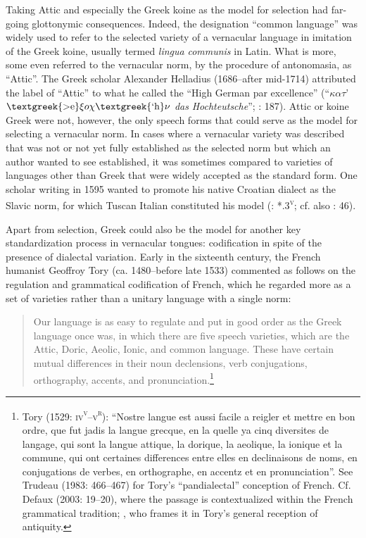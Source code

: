 Taking Attic and especially the Greek koine as the model for selection had far-going glottonymic consequences. Indeed, the designation “common language” was widely used to refer to the selected variety of a vernacular language in imitation of the Greek koine, usually termed \textit{lingua} \textit{communis} in Latin. What is more, some even referred to the vernacular norm, by the procedure of antonomasia, as “Attic”. The Greek scholar Alexander Helladius (1686–after mid-1714) attributed the label of “Attic” to what he called the “High German par excellence” (“$\kappa \alpha \tau $’ $\text{\textgreek{>e}}\xi o\chi \text{\textgreek{`h}}\nu $ \textit{das} \textit{Hochteutsche}”; \citealt{Helladius1714}: 187). Attic or koine Greek were not, however, the only speech forms that could serve as the model for selecting a vernacular norm. In cases where a vernacular variety was described that was not or not yet fully established as the selected norm but which an author wanted to see established, it was sometimes compared to varieties of languages other than Greek that were widely accepted as the standard form. One scholar writing in 1595 wanted to promote his native Croatian dialect as the Slavic norm, for which Tuscan Italian constituted his model (\citealt{Veranzio1595}: *.3\textsc{\textsuperscript{v}}; cf. also \citealt{Schoppe1636}: 46).

Apart from selection, Greek could also be the model for another key standardization process in vernacular tongues: codification in spite of the presence of dialectal variation. Early in the sixteenth century, the French humanist Geoffroy Tory (ca. 1480–before late 1533) commented as follows on the regulation and grammatical codification of French, which he regarded more as a set of varieties rather than a unitary language with a single norm:

\begin{quote}
Our language is as easy to regulate and put in good order as the Greek language once was, in which there are five speech varieties, which are the Attic, Doric, Aeolic, Ionic, and common language. These have certain mutual differences in their noun declensions, verb conjugations, orthography, accents, and pronunciation.\footnote{Tory (1529: \textsc{iv}\textsc{\textsuperscript{v}}\textsc{–v}\textsc{\textsuperscript{r}}): “Nostre langue est aussi facile a reigler et mettre en bon ordre, que fut jadis la langue grecque, en la quelle ya cinq diversites de langage, qui sont la langue attique, la dorique, la aeolique, la ionique et la commune, qui ont certaines differences entre elles en declinaisons de noms, en conjugations de verbes, en orthographe, en accentz et en pronunciation”. See Trudeau (1983: 466–467) for Tory’s “pandialectal” conception of French. Cf. Defaux (2003: 19–20), where the passage is contextualized within the French grammatical tradition; \citet[23]{Cordier2006}, who frames it in Tory’s general reception of antiquity.}
\end{quote}

